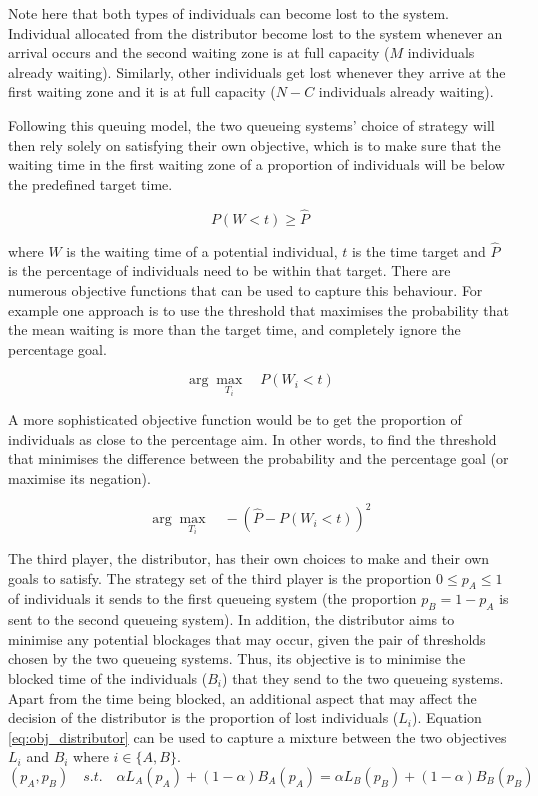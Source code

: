 Note here that both types of individuals can become lost to the system. 
Individual allocated from the distributor become lost to the system whenever 
an arrival occurs and the second waiting zone is at full capacity (\(M\) 
individuals already waiting).
Similarly, other individuals get lost whenever they arrive at the first waiting 
zone and it is at full capacity (\(N - C\) individuals already waiting).

Following this queuing model, the two queueing systems' choice of strategy will 
then rely solely on satisfying their own 
objective, which is to make sure that the waiting time in the first waiting zone 
of a proportion of individuals will be below the predefined target time.

\begin{equation}
    P(W < t) \geq \hat{P}
\end{equation}

where \(W\) is the waiting time of a potential individual, \(t\) is the time 
target and \(\hat{P}\) is the percentage of individuals need to be within that 
target. 
There are numerous objective functions that can be used to capture this 
behaviour. 
For example one approach is to use the threshold that maximises the probability 
that 
the mean waiting is more than the target time, and completely ignore the 
percentage goal.

\begin{equation}
    \arg \max_{T_i} \quad P(W_i < t)
\end{equation}

A more sophisticated objective function would be to get the proportion 
of individuals as close to the percentage aim. 
In other words, to find the threshold that minimises the difference between the 
probability and the percentage goal (or maximise its negation).

\begin{equation}\label{eq:obj_queueing_systems}
    \arg \max_{T_i} \quad -\left( \hat{P} - P(W_i < t) \right)^2
\end{equation}


The third player, the distributor, has their own choices to make and their own 
goals to satisfy.
The strategy set of the third player is the proportion \(0 \leq p_A \leq 1\) of 
individuals it sends to the first queueing system (the proportion 
\(p_B = 1 - p_A\) is sent to the second queueing system).
In addition, the distributor aims to minimise any potential blockages
that may occur, given the pair of thresholds chosen by the two queueing systems.
Thus, its objective is to minimise the blocked time of the individuals (\(B_i\))
that they send to the two queueing systems.
Apart from the time being blocked, an additional aspect that may affect the 
decision of the distributor is the proportion of lost individuals (\(L_i\)).
Equation \ref{eq:obj_distributor} can be used to capture a mixture 
between the two objectives \(L_i\) and \(B_i\) where \(i \in \{A, B\}\).
\begin{equation*}\label{eq:obj_distributor}
    (p_A, p_B) \quad s.t. \quad 
    \alpha L_A(p_A) + (1 - \alpha) B_A(p_A) = 
    \alpha L_B(p_B) + (1 - \alpha) B_B(p_B)
\end{equation*}

